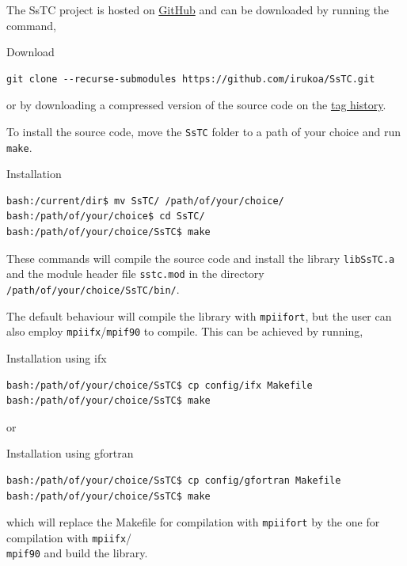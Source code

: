\documentclass[10pt,a4paper]{article}
\begin{document}
The SsTC project is hosted on \href{https://github.com/irukoa/SsTC}{GitHub} and can be downloaded by running the command,

\begin{codebox}{Download}
\begin{verbatim}
git clone --recurse-submodules https://github.com/irukoa/SsTC.git
\end{verbatim}
\end{codebox}
or by downloading a compressed version of the source code on the \href{https://github.com/irukoa/SsTC/tags}{tag history}.

To install the source code, move the \verb|SsTC| folder to a path of your choice and run \verb|make|.
\begin{codebox}{Installation}
\begin{verbatim}
bash:/current/dir$ mv SsTC/ /path/of/your/choice/
bash:/path/of/your/choice$ cd SsTC/
bash:/path/of/your/choice/SsTC$ make
\end{verbatim}
\end{codebox}
These commands will compile the source code and install the library \verb|libSsTC.a| and the module header file \verb|sstc.mod| in the directory \verb|/path/of/your/choice/SsTC/bin/|.

The default behaviour will compile the library with \verb|mpiifort|, but the user can also employ \verb|mpiifx|/\verb|mpif90| to compile. This can be achieved by running,
\begin{codebox}{Installation using ifx}
\begin{verbatim}
bash:/path/of/your/choice/SsTC$ cp config/ifx Makefile
bash:/path/of/your/choice/SsTC$ make
\end{verbatim}
\end{codebox}
or
\begin{codebox}{Installation using gfortran}
\begin{verbatim}
bash:/path/of/your/choice/SsTC$ cp config/gfortran Makefile
bash:/path/of/your/choice/SsTC$ make
\end{verbatim}
\end{codebox}
which will replace the Makefile for compilation with \verb|mpiifort| by the one for compilation with \verb|mpiifx|/\\ \verb|mpif90| and build the library.
\end{document}
